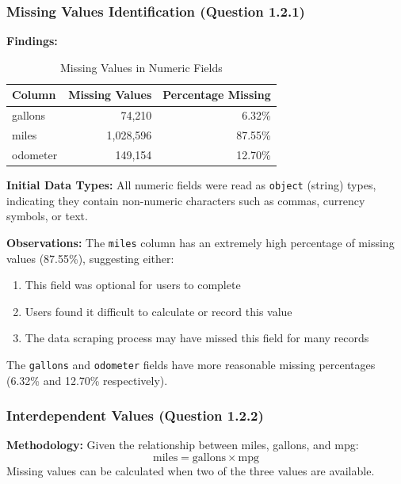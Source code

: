 \documentclass{article}
\begin{document}
\subsubsection{Missing Values Identification (Question 1.2.1)}

\textbf{Findings:}

\begin{table}[H]
    \centering
    \caption{Missing Values in Numeric Fields}
    \begin{tabular}{l r r}
        \toprule
        \textbf{Column} & \textbf{Missing Values} & \textbf{Percentage Missing} \\
        \midrule
        gallons & 74,210 & 6.32\% \\
        miles & 1,028,596 & 87.55\% \\
        odometer & 149,154 & 12.70\% \\
        \bottomrule
    \end{tabular}
    \label{tab:missing_values}
\end{table}

\textbf{Initial Data Types:}
All numeric fields were read as \texttt{object} (string) types, indicating they contain non-numeric characters such as commas, currency symbols, or text.

\textbf{Observations:}
The \texttt{miles} column has an extremely high percentage of missing values (87.55\%), suggesting either:
\begin{enumerate}
    \item This field was optional for users to complete
    \item Users found it difficult to calculate or record this value
    \item The data scraping process may have missed this field for many records
\end{enumerate}

The \texttt{gallons} and \texttt{odometer} fields have more reasonable missing percentages (6.32\% and 12.70\% respectively).

\subsubsection{Interdependent Values (Question 1.2.2)}

\textbf{Methodology:}
Given the relationship between miles, gallons, and mpg:
\[
\text{miles} = \text{gallons} \times \text{mpg}
\]
Missing values can be calculated when two of the three values are available.
\end{document}
